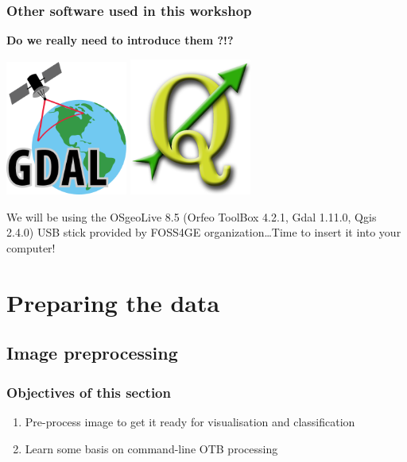\documentclass[8pt]{beamer}
\begin{document}
\begin{frame}
\frametitle{Other software used in this workshop}

\textbf{Do we really need to introduce them ?!?}

\begin{center}
\href{http://gdal.org/}{\includegraphics[width=0.3\textwidth]{images/gdal.png}} \quad \href{http://qgis.org/en/site/}{\includegraphics[width=0.3\textwidth]{images/qgis.png}}
\end{center}

We will be using the OSgeoLive 8.5 (Orfeo ToolBox 4.2.1, Gdal 1.11.0, Qgis 2.4.0) USB stick provided by FOSS4GE organization\ldots Time to insert it into your computer! 

\end{frame}


\section{Preparing the data}


\subsection{Image preprocessing}

\begin{frame}
\frametitle{Objectives of this section}

\begin{enumerate}
\item Pre-process image to get it ready for visualisation and classification
\item Learn some basis on command-line OTB processing
\end{enumerate}

\end{frame}
\end{document}
